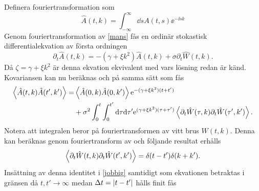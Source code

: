 
Definera fouriertransformation som
\begin{equation}
    \hat{A}(t,k)=\int_{-\infty}^{\infty}\dd{s} A(t,s)\ee^{-\ii sk}
\end{equation}
Genom fouriertransformation av \eqref{mans} fås en ordinär stokastisk differentialekvation av första ordningen
\begin{equation}
        \partial_{t}\hat{A}(t,k)=-\left(\gamma+\xi k^2\right)\hat{A}(t,k)+\sigma \partial_{t}\hat{W}(t,k).
\end{equation}
Då $\zeta=\gamma+\xi k^2$ är denna ekvation ekvivalent med  vars lösning redan är känd. Kovariansen kan nu beräknas och på samma sätt som  fås
\begin{equation}\label{jobbig}
\begin{aligned}
    \ev{\hat{A}(t,k)\hat{A}(t',k')} =& \ev{\hat{A}(0,k)\hat{A}(0,k')} \ee^{-(\gamma+\xi k^2)(t+t')}\\ 
    &+ \sigma^2 \int_{0}^{t}\int_{0}^{t'}\dd\tau\dd\tau' \ee^{(\gamma+\xi k^2)(\tau+\tau')} \ev{\partial_{t}\hat{W}(\tau,k)\partial_{t}\hat{W}(\tau',k')}.
\end{aligned}
\end{equation}
Notera att integralen beror på fouriertransformen av vitt brus $W(t,k)$. Denna kan beräknas genom fouriertransform av  och följande resultat erhålls 
\begin{equation}
    \ev{\partial_{t}\hat{W}(t,k)\partial_{t}\hat{W}(t',k')}=\delta(t-t')\delta(k+k').
\end{equation}
Insättning av denna identitet i \eqref{jobbig} samtidigt som ekvationen betraktas i gränsen då $t,t'\rightarrow\infty$ medan $\Delta t=\abs{t-t'}$ hålls finit fås 

